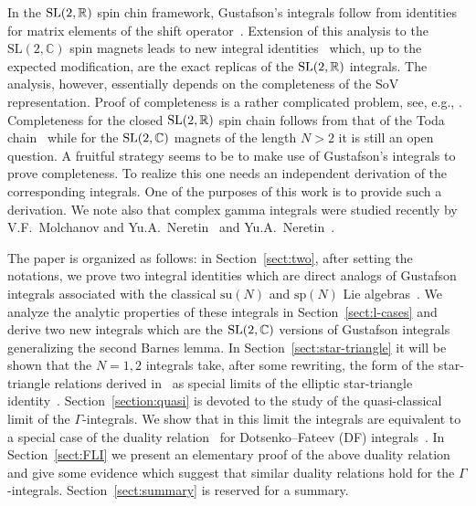 \documentclass[pdftex]{sigma}
\numberwithin{equation}{section}
\begin{document}
In the ${\rm SL}(2,\mathbb R)$ spin chin framework, Gustafson's integrals follow from identities for matrix elements
of the shift operator~\cite{Derkachov:2016dhc}.
 Extension of this analysis to the
$\mathrm{SL}(2,\mathbb{C})$ spin magnets leads to new integral identities~\cite{Derkachov:2016ucn,Derkachov:2017pvx}
which, up to the expected modification, are the exact replicas of the ${\rm SL}(2,\mathbb R)$ integrals. The analysis,
however, essentially depends on the completeness of the SoV representation. Proof of completeness is a rather
complicated problem, see, e.g., \cite{Derkachov:2018lyz,Kozlowski:2014jka,Schrader18}. Completeness for the closed
${\rm SL}(2,\mathbb R)$ spin chain follows from that of the Toda chain~\cite{Kozlowski:2014jka} while for the
${\rm SL}(2,\mathbb C)$ magnets of the length $N>2$ it is still an open question. A fruitful strategy seems to be to
make use of Gustafson's integrals to prove completeness. To realize this one needs an independent derivation of the
corresponding integrals. One of the purposes of this work is to provide such a derivation. We note also that complex
gamma integrals were studied recently by V.F.~Molchanov and Yu.A.~Neretin~\cite{Neretin} and
Yu.A.~Neretin~\cite{2018arXiv181207341N,Neretin:2019xze}.

The paper is organized as follows: in Section~\ref{sect:two}, after setting the notations, we prove two integral
identities which are direct analogs of Gustafson integrals associated with the classical $\textrm{su}(N)$ and
$\textrm{sp}(N)$ Lie algebras~\cite{Gustafson94}. We analyze the analytic properties of these integrals in
Section~\ref{sect:l-cases} and derive two new integrals which are the ${\rm SL}(2,\mathbb C)$ versions of Gustafson
integrals~\cite{Gustafson92} generalizing the second Barnes lemma. In Section~\ref{sect:star-triangle} it will be shown
that the $N=1,2$ integrals take, after some rewriting, the form of the star-triangle relations derived
in~\cite{Bazhanov:2007vg,Kels:2013ola,Kels:2015bda} as special limits of the elliptic star-triangle
identity~\cite{Bazhanov:2010kz,Derkachov:2012iv,Spiridonov18,Spiridonov:2010em}. Section~\ref{section:quasi} is devoted
to the study of the quasi-classical limit of the $\Gamma$-integrals. We show that in this limit the integrals are
equivalent to a special case of the duality relation~\cite{Baseilhac:1998eq} for Dotsenko--Fateev (DF)
integrals~\cite{Dotsenko:1984ad}. In Section~\ref{sect:FLI} we present an elementary proof of the above duality
relation and give some evidence which suggest that similar duality relations hold for the $\Gamma$-integrals.
Section~\ref{sect:summary} is reserved for a summary.
\end{document}
